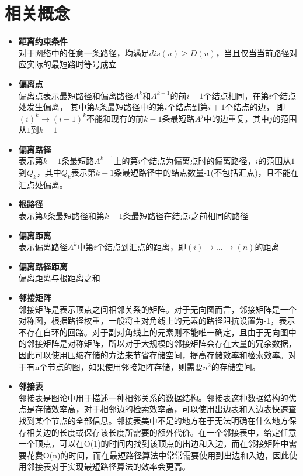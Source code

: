 \section{相关概念}\label{sec:相关概念}
\begin{itemize}%
    \item \textbf{距离约束条件}\\对于网络中的任意一条路径，均满足$dis(u)\geq D(u)$，当且仅当当前路径对应实际的最短路时等号成立
    \item \textbf{偏离点}\\偏离点表示最短路径和偏离路径$A^k$和$A^{k-1}$的前$i-1$个结点相同，在第$i$个结点处发生偏离， 其中第$k$条最短路径中的第$i$个结点到第$i+1$个结点的边， 即$(i)^k \to (i+1)^k$不能和现有的前$k-1$条最短路$A^j$中的边重复，其中$j$的范围从$1$到$k-1$
    \item \textbf{偏离路径}\\表示第$k-1$条最短路$A^{k-1}$上的第$i$个结点为偏离点时的偏离路径，$i$的范围从$1$到$Q_k$，其中$Q_k$表示第$k-1$条最短路径中的结点数量-1(不包括汇点)，且不能在汇点处偏离。
    \item \textbf{根路径}\\表示第$k$条最短路径和第$k-1$条最短路径在结点$i$之前相同的路径
    \item \textbf{偏离距离}\\表示偏离路径$A^k$中第$i$个结点到汇点的距离，即$(i)\to\dots\to(n)$的距离
    \item \textbf{偏离路径距离}\\偏离距离与根距离之和
    \item \textbf{邻接矩阵}\\邻接矩阵是表示顶点之间相邻关系的矩阵。对于无向图而言，邻接矩阵是一个对称图，根据路径权重，一般将主对角线上的元素的路径阻抗设置为-1，表示不存在自环的回路。对于副对角线上的元素则不能唯一确定，且由于无向图中的邻接矩阵是对称矩阵，所以对于大规模的邻接矩阵会存在大量的冗余数据，因此可以使用压缩存储的方法来节省存储空间，提高存储效率和检索效率。对于有n个节点的图，如果使用邻接矩阵存储，则需要$n^2$的存储空间。
    \item \textbf{邻接表}\\邻接表是图论中用于描述一种相邻关系的数据结构。邻接表这种数据结构的优点是存储效率高，对于相邻边的检索效率高，可以使用出边表和入边表快速查找到某个节点的全部信息。邻接表美中不足的地方在于无法明确在什么地方保存相关边的长度或保存该长度所需要的额外代价。在一个邻接表中，给定任意一个顶点，可以在O(1)的时间内找到该顶点的出边和入边，而在邻接矩阵中需要花费O(n)的时间，而在最短路径算法中常常需要使用到出边和入边，因此使用邻接表对于实现最短路径算法的效率会更高。

\end{itemize}
